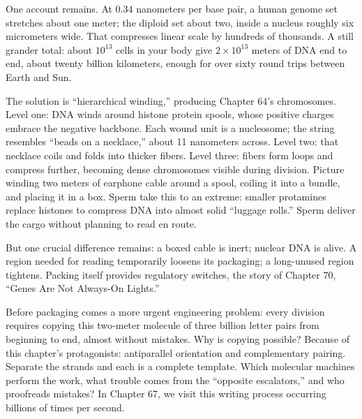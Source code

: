 One account remains. At 0.34 nanometers per base pair, a human genome set stretches about one meter; the diploid set about two, inside a nucleus roughly six micrometers wide. That compresses linear scale by hundreds of thousands. A still grander total: about $10^{13}$ cells in your body give $2\times 10^{13}$ meters of DNA end to end, about twenty billion kilometers, enough for over sixty round trips between Earth and Sun.

The solution is ``hierarchical winding,'' producing Chapter 64's chromosomes. Level one: DNA winds around histone protein spools, whose positive charges embrace the negative backbone. Each wound unit is a nucleosome; the string resembles ``beads on a necklace,'' about 11 nanometers across. Level two: that necklace coils and folds into thicker fibers. Level three: fibers form loops and compress further, becoming dense chromosomes visible during division. Picture winding two meters of earphone cable around a spool, coiling it into a bundle, and placing it in a box. Sperm take this to an extreme: smaller protamines replace histones to compress DNA into almost solid ``luggage rolls.'' Sperm deliver the cargo without planning to read en route.

But one crucial difference remains: a boxed cable is inert; nuclear DNA is alive. A region needed for reading temporarily loosens its packaging; a long-unused region tightens. Packing itself provides regulatory switches, the story of Chapter 70, ``Genes Are Not Always-On Lights.''

Before packaging comes a more urgent engineering problem: every division requires copying this two-meter molecule of three billion letter pairs from beginning to end, almost without mistakes. Why is copying possible? Because of this chapter's protagonists: antiparallel orientation and complementary pairing. Separate the strands and each is a complete template. Which molecular machines perform the work, what trouble comes from the ``opposite escalators,'' and who proofreads mistakes? In Chapter 67, we visit this writing process occurring billions of times per second.

